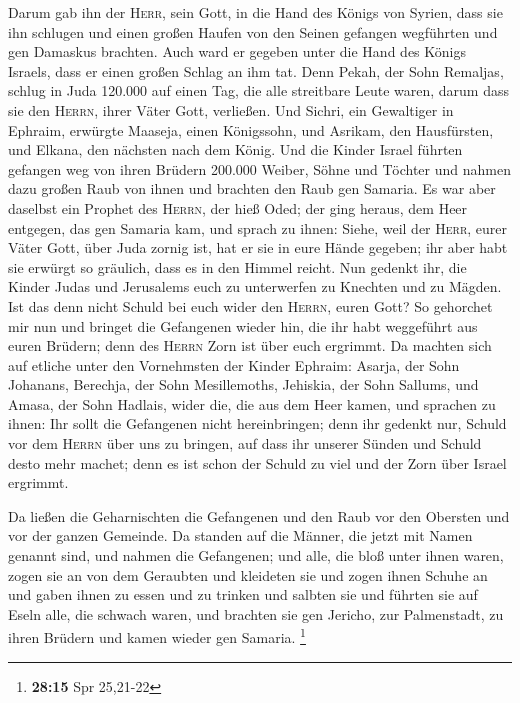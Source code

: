  Darum gab ihn der \textsc{Herr}, sein Gott, in die Hand
des Königs von Syrien, dass sie ihn schlugen und einen großen Haufen von
den Seinen gefangen wegführten und gen Damaskus brachten. Auch ward er
gegeben unter die Hand des Königs Israels, dass er einen großen Schlag
an ihm tat.  Denn Pekah, der Sohn Remaljas, schlug in Juda
120.000 auf einen Tag, die alle streitbare Leute waren, darum dass sie
den \textsc{Herrn}, ihrer Väter Gott, verließen.  Und
Sichri, ein Gewaltiger in Ephraim, erwürgte Maaseja, einen Königssohn,
und Asrikam, den Hausfürsten, und Elkana, den nächsten nach dem König.
 Und die Kinder Israel führten gefangen weg von ihren
Brüdern 200.000 Weiber, Söhne und Töchter und nahmen dazu großen Raub
von ihnen und brachten den Raub gen Samaria.  Es war aber
daselbst ein Prophet des \textsc{Herrn}, der hieß Oded; der ging heraus,
dem Heer entgegen, das gen Samaria kam, und sprach zu ihnen: Siehe, weil
der \textsc{Herr}, eurer Väter Gott, über Juda zornig ist, hat er sie in
eure Hände gegeben; ihr aber habt sie erwürgt so gräulich, dass es in
den Himmel reicht.  Nun gedenkt ihr, die Kinder Judas und
Jerusalems euch zu unterwerfen zu Knechten und zu Mägden. Ist das denn
nicht Schuld bei euch wider den \textsc{Herrn}, euren Gott?
 So gehorchet mir nun und bringet die Gefangenen wieder
hin, die ihr habt weggeführt aus euren Brüdern; denn des \textsc{Herrn}
Zorn ist über euch ergrimmt.  Da machten sich auf etliche
unter den Vornehmsten der Kinder Ephraim: Asarja, der Sohn Johanans,
Berechja, der Sohn Mesillemoths, Jehiskia, der Sohn Sallums, und Amasa,
der Sohn Hadlais, wider die, die aus dem Heer kamen,  und
sprachen zu ihnen: Ihr sollt die Gefangenen nicht hereinbringen; denn
ihr gedenkt nur, Schuld vor dem \textsc{Herrn} über uns zu bringen, auf
dass ihr unserer Sünden und Schuld desto mehr machet; denn es ist schon
der Schuld zu viel und der Zorn über Israel ergrimmt.

 Da ließen die Geharnischten die Gefangenen und den Raub
vor den Obersten und vor der ganzen Gemeinde.  Da standen
auf die Männer, die jetzt mit Namen genannt sind, und nahmen die
Gefangenen; und alle, die bloß unter ihnen waren, zogen sie an von dem
Geraubten und kleideten sie und zogen ihnen Schuhe an und gaben ihnen zu
essen und zu trinken und salbten sie und führten sie auf Eseln alle, die
schwach waren, und brachten sie gen Jericho, zur Palmenstadt, zu ihren
Brüdern und kamen wieder gen Samaria. \footnote{\textbf{28:15} Spr
  25,21-22}

